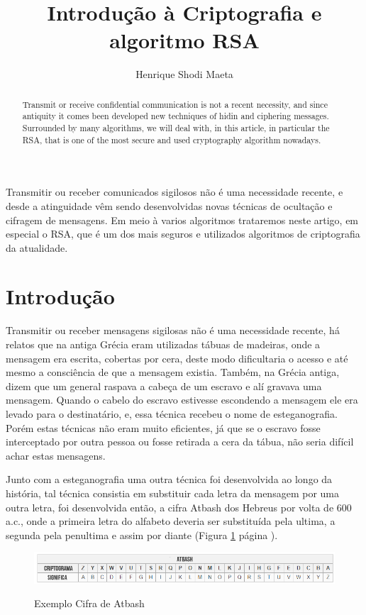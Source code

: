 \documentclass[12pt]{article}
\title{Introdu\c c\~{a}o \`{a} Criptografia e algoritmo RSA}
\author{Henrique Shodi Maeta}
\begin{document}
 

\maketitle

\begin{abstract}
Transmit or receive confidential communication is not a recent necessity, and since antiquity it comes been developed new techniques of hidin and ciphering messages. Surrounded by many algorithms,  we will deal with, in this article, in particular the RSA, that is one of the most secure and used cryptography algorithm nowadays. 
  
\end{abstract}
     
\begin{resumo} 
Transmitir ou receber comunicados sigilosos n\~{a}o \'{e} uma necessidade recente, e desde a atinguidade  v\^{e}m sendo desenvolvidas novas t\'{e}cnicas de oculta\c c\~{a}o e cifragem de mensagens. Em meio \`{a} varios algoritmos trataremos neste artigo, em especial o RSA, que \'{e} um dos mais seguros e utilizados algoritmos de criptografia da atualidade.
\end{resumo}


\section{Introdu\c c\~{a}o}


 Transmitir ou receber mensagens sigilosas n\~{a}o \'{e} uma necessidade recente, h\'{a} relatos que na antiga Gr\'{e}cia eram utilizadas t\'{a}buas de madeiras, onde a mensagem era escrita, cobertas por cera, deste modo dificultaria o acesso e at\'{e} mesmo a consci\^{e}ncia de que a mensagem existia. Tamb\'{e}m, na Gr\'{e}cia antiga, dizem que um general raspava a cabe\c ca de um escravo e al\'{i} gravava uma mensagem. Quando o cabelo do escravo estivesse escondendo a mensagem ele era levado para o destinat\'{a}rio, e, essa t\'{e}cnica recebeu o nome de esteganografia. Por\'{e}m estas t\'{e}cnicas n\~{a}o eram muito eficientes, j\'{a} que se o escravo fosse interceptado por outra pessoa ou fosse retirada a cera da t\'{a}bua, n\~{a}o seria dif\'{i}cil achar estas mensagens. 
 
 Junto com a esteganografia uma outra t\'{e}cnica foi desenvolvida ao longo da hist\'{o}ria, tal t\'{e}cnica consistia em substituir cada letra da mensagem por uma outra letra, foi desenvolvida ent\~{a}o, a cifra Atbash dos Hebreus por volta de 600 a.c., onde a primeira letra do alfabeto deveria ser substitu\'{i}da pela ultima, a segunda pela penultima e assim por diante (Figura \ref{1} p\'{a}gina \pageref{1}).
\begin{figure}[!h]
\centering
\includegraphics[scale = .5]{atbash}
\caption{Exemplo Cifra de Atbash}
\label{1}
\cite{gravity}
\end{figure}
 
\end{document}
